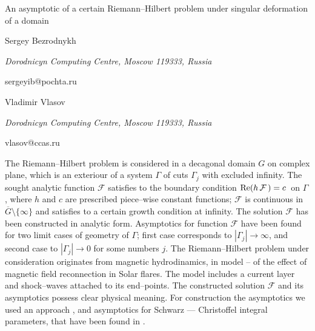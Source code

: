 \documentclass[10pt,a4paper]{article}
\begin{document}
\begin{center}

{\Large An asymptotic of a certain Riemann--Hilbert problem under singular deformation of a domain}

\bigskip


{\sc Sergey Bezrodnykh}

{\small\it Dorodnicyn Computing Centre, Moscow 119333, Russia}

{\small\rm sergeyib@pochta.ru}


\bigskip

{\sc Vladimir Vlasov}

{\small\it Dorodnicyn Computing Centre, Moscow 119333, Russia}

{\small\rm vlasov@ccas.ru}

\end{center}

\bigskip


The Riemann--Hilbert problem is considered in a decagonal domain $G$ on complex plane,
which is an exteriour of a system $\Gamma$ of cuts $\Gamma_j$ with excluded
infinity. The sought analytic function $\mathcal{F}$ satisfies 
to the boundary condition ${\rm Re} (h\, \mathcal{F}\,) = c$\, on $\Gamma$,
where $h$ and $c$ are prescribed piece--wise constant functions;
$\mathcal{F}$ is continuous in $\overline{G} \setminus \{\infty\}$
and satisfies to a certain growth condition
at infinity. The solution $\mathcal{F}$ has been constructed in analytic form.
Asymptotics for function $\mathcal{F}$ have been found for two limit
cases of geometry of $\Gamma$; first case corresponds to $|\Gamma_j| \to \infty$,
and second case to $|\Gamma_j| \to 0$ for some numbers $j$.
The Riemann--Hilbert problem under consideration originates from magnetic 
hydrodinamics, in model \cite{S06}--\cite{BVS11} of the effect of magnetic field reconnection 
in Solar flares. The model includes a current layer and shock--waves attached to 
its end--points. The constructed solution $\mathcal{F}$ and its 
asymptotics possess clear physical meaning. For construction the asymptotics
we used an approach \cite{VMS89}, \cite{V87} and asymptotics
for Schwarz --- Christoffel integral parameters, that have been found in \cite{BV02}.
\end{document}
